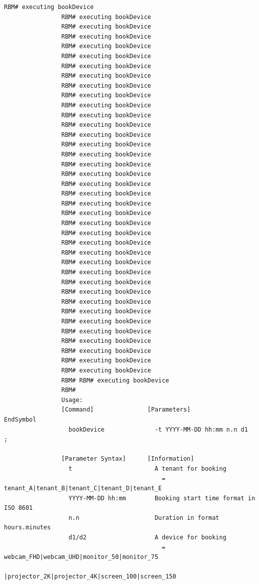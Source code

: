 \documentclass{article}
\begin{document}
\begin{Verbatim}[gobble=8]
                RBM# executing bookDevice
                RBM# executing bookDevice
                RBM# executing bookDevice
                RBM# executing bookDevice
                RBM# executing bookDevice
                RBM# executing bookDevice
                RBM# executing bookDevice
                RBM# executing bookDevice
                RBM# executing bookDevice
                RBM# executing bookDevice
                RBM# executing bookDevice
                RBM# executing bookDevice
                RBM# executing bookDevice
                RBM# executing bookDevice
                RBM# executing bookDevice
                RBM# executing bookDevice
                RBM# executing bookDevice
                RBM# executing bookDevice
                RBM# executing bookDevice
                RBM# executing bookDevice
                RBM# executing bookDevice
                RBM# executing bookDevice
                RBM# executing bookDevice
                RBM# executing bookDevice
                RBM# executing bookDevice
                RBM# executing bookDevice
                RBM# executing bookDevice
                RBM# executing bookDevice
                RBM# executing bookDevice
                RBM# executing bookDevice
                RBM# executing bookDevice
                RBM# executing bookDevice
                RBM# executing bookDevice
                RBM# executing bookDevice
                RBM# executing bookDevice
                RBM# executing bookDevice
                RBM# executing bookDevice
                RBM# executing bookDevice
                RBM# RBM# executing bookDevice
                RBM# 
                Usage: 
                [Command]               [Parameters]                            EndSymbol     
                  bookDevice              -t YYYY-MM-DD hh:mm n.n d1              ;           
                
                [Parameter Syntax]      [Information]                                         
                  t                       A tenant for booking                                
                                            = tenant_A|tenant_B|tenant_C|tenant_D|tenant_E    
                  YYYY-MM-DD hh:mm        Booking start time format in ISO 8601               
                  n.n                     Duration in format hours.minutes                    
                  d1/d2                   A device for booking                                
                                            = webcam_FHD|webcam_UHD|monitor_50|monitor_75     
                                              |projector_2K|projector_4K|screen_100|screen_150
                

\end{Verbatim}
\end{document}
